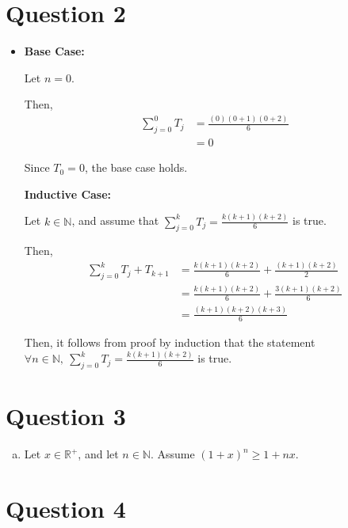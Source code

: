 \documentclass[12pt]{article}
\begin{document}
\section*{Question 2}
\begin{itemize}
    \item

    \textbf{Base Case:}

    Let $n = 0$.

    \bigskip

    Then,
    \setcounter{equation}{0}
    \begin{align}
        \sum\limits_{j=0}^0 T_j &= \frac{(0)(0 + 1)(0 + 2)}{6}\\
        &= 0
    \end{align}

    \bigskip

    Since $T_0 = 0$, the base case holds.

    \bigskip

    \textbf{Inductive Case:}

    \bigskip

    Let $k \in \mathbb{N}$, and assume that $\sum\limits_{j=0}^k T_j =
    \frac{k(k+1)(k+2)}{6}$ is true.

    \bigskip

    Then,
    \setcounter{equation}{0}
    \begin{align}
        \sum\limits_{j=0}^k T_j + T_{k+1} &= \frac{k(k+1)(k+2)}{6} + \frac{(k+1)(k+2)}{2}\\
        &= \frac{k(k+1)(k+2)}{6} + \frac{3(k+1)(k+2)}{6}\\
        &= \frac{(k+1)(k+2)(k+3)}{6}
    \end{align}

    \bigskip

    Then, it follows from proof by induction that the statement $\forall n \in
    \mathbb{N},\:\sum\limits_{j=0}^k T_j = \frac{k(k+1)(k+2)}{6}$ is true.

\end{itemize}

\section*{Question 3}
\begin{enumerate}[a.]
    \item

    Let $x \in \mathbb{R}^{+}$, and let $n \in \mathbb{N}$. Assume $(1+x)^n \geq
    1 + nx$.

\end{enumerate}

\section*{Question 4}
\end{document}

